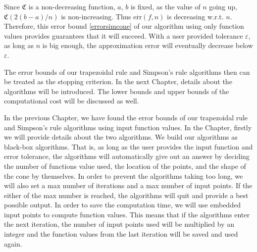 \documentclass{iitthesis}
\DeclareMathOperator{\Var}{Var}
\theoremstyle{definition}
\theoremstyle{remark}
\begin{document}
Since $\mathfrak{C}$ is a non-decreasing function, $a$, $b$ is fixed, as the value of $n$ going up, $\mathfrak{C}(2(b-a)/n)$ is non-increasing. Thus $\overline{\text{err}}(f,n)$ is decreasing w.r.t. $n$. Therefore, this error bound \eqref{errorsimcone} of our algorithm using only function values provides guarantees that it will succeed. With a user provided tolerance $\varepsilon$, as long as $n$ is big enough, the approximation error will eventually decrease below $\varepsilon$.

The error bounds of our trapezoidal rule and Simpson's rule algorithms then can be treated as the stopping criterion. In the next Chapter, details about the algorithms will be introduced. The lower bounds and upper bounds of the computational cost will be discussed as well.

%




In the previous Chapter, we have found the error bounds of our trapezoidal rule and Simpson's rule algorithms using input function values. In the Chapter, firstly we will provide details about the two algorithms. We build our algorithms as black-box algorithms. That is, as long as the user provides the input function and error tolerance, the algorithms will automatically give out an answer by deciding the number of functions value used, the location of the points, and the shape of the cone by themselves. In order to prevent the algorithms taking too long, we will also set a max number of iterations and a max number of input points. If the either of the max number is reached, the algorithms will quit and provide a best possible output. In order to save the computation time, we will use embedded input points to compute function values. This means that if the algorithms enter the next iteration, the number of input points used will be multiplied by an integer and the function values from the last iteration will be saved and used again.

\end{document}
